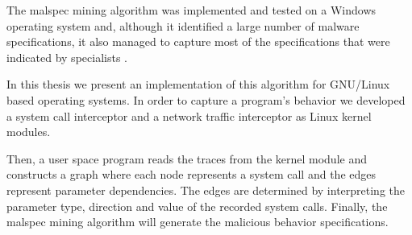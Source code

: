The malspec mining algorithm was implemented and tested on a Windows operating system and, although it identified a large number of malware specifications, it also managed to capture most of the specifications that were indicated by specialists \cite{mining-specifications}.

In this thesis we present an implementation of this algorithm for GNU/Linux based operating systems. In order to capture a program’s behavior we developed a system call interceptor and a network traffic interceptor as Linux kernel modules.

Then, a user space program reads the traces from the kernel module and constructs a graph where each node represents a system call and the edges represent parameter dependencies. The edges are determined by interpreting the parameter type, direction and value of the recorded system calls. Finally, the malspec mining algorithm will generate the malicious behavior specifications.
